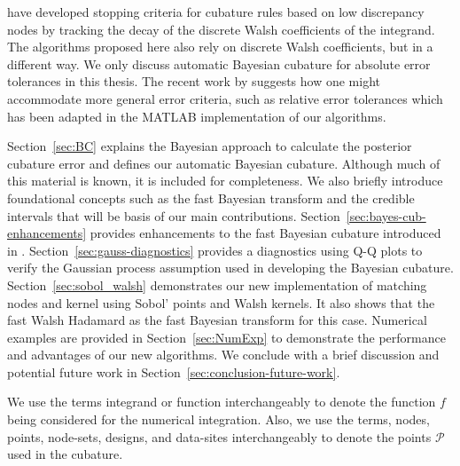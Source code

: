 \documentclass{svjour3}                     %
\begin{document}
\cite{HicJim16a,JimHic16a} have developed stopping criteria for cubature rules based on low discrepancy nodes by tracking the decay of the discrete Walsh coefficients of the integrand.  The algorithms proposed here also rely on discrete Walsh coefficients, but in a different way.  We only discuss automatic Bayesian cubature for absolute error tolerances in this thesis. The recent work by \cite{HicEtal17a} suggests how one might accommodate more general error criteria, such as relative error tolerances which has been adapted in the MATLAB implementation of our algorithms.

Section~\ref{sec:BC} explains the Bayesian approach to calculate the posterior cubature error and defines our automatic Bayesian cubature. Although much of this material is known, it is included for completeness.  We also briefly introduce foundational concepts such as the fast Bayesian transform and the credible intervals that will be basis of our main contributions.
Section~\ref{sec:bayes-cub-enhancements} provides enhancements to the fast Bayesian cubature introduced in \cite{JagHic19a}.
Section~\ref{sec:gauss-diagnostics} provides a diagnostics using Q-Q plots to verify the Gaussian process assumption used in developing the Bayesian cubature.
Section~\ref{sec:sobol_walsh} demonstrates our new implementation of matching nodes and kernel using Sobol' points and Walsh kernels. It also shows that the fast Walsh Hadamard as the fast Bayesian transform for this case.
Numerical examples are provided in Section~\ref{sec:NumExp} to demonstrate the performance and advantages of our new algorithms.  We conclude with a brief discussion and potential future work in Section~\ref{sec:conclusion-future-work}.


We use the terms integrand or function interchangeably to denote the function $f$ being considered for the numerical integration. Also, we use the terms, nodes, points, node-sets, designs, and data-sites interchangeably to denote the points $\mathcal{P}$ used in the cubature.
\end{document}
